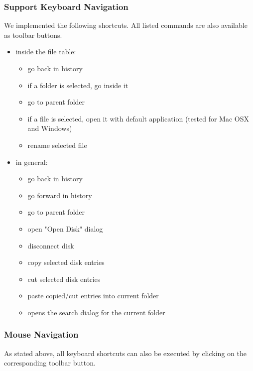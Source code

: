 \documentclass[a4paper,12pt]{article}
\begin{document}
\subsubsection{Support Keyboard Navigation}
We implemented the following shortcuts. All listed commands are also available as toolbar buttons.
\begin{itemize}
    \item inside the file table:
    \begin{itemize}
        \item \keys{$\leftarrow$} go back in history
        \item \keys{$\rightarrow$} if a folder is selected, go inside it
        \item \keys{$\uparrow$} go to parent folder
        \item \keys{\enter} if a file is selected, open it with default application (tested for Mac OSX and Windows)
        \item {} rename selected file
    \end{itemize}
    \item in general:
    \begin{itemize}
        \item \keys{\Alt + $\leftarrow$} go back in history
        \item \keys{\Alt + $\rightarrow$} go forward in history
        \item \keys{\Alt + $\uparrow$} go to parent folder
        \item {} open "Open Disk" dialog
        \item {} disconnect disk
        \item {} copy selected disk entries
        \item {} cut selected disk entries
        \item {} paste copied/cut entries into current folder
        \item {} opens the search dialog for the current folder
    \end{itemize}
\end{itemize}

\subsubsection{Mouse Navigation}
As stated above, all keyboard shortcuts can also be executed by clicking on the corresponding toolbar button.
\end{document}

